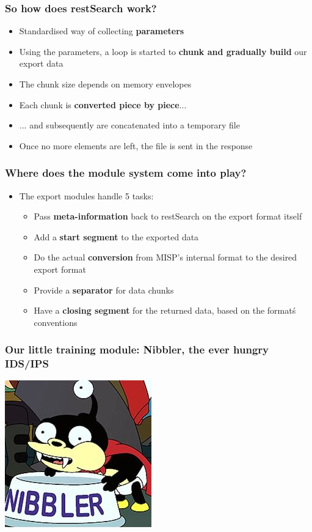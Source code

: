 \begin{frame}
  \frametitle{So how does restSearch work?}
  \begin{itemize}
    \item Standardised way of collecting {\bf parameters}
    \item Using the parameters, a loop is started to {\bf chunk and gradually build} our export data
    \item The chunk size depends on memory envelopes
    \item Each chunk is {\bf converted piece by piece}...
    \item ... and subsequently are concatenated into a temporary file
    \item Once no more elements are left, the file is sent in the response
  \end{itemize}
\end{frame}

\begin{frame}
  \frametitle{Where does the module system come into play?}
  \begin{itemize}
    \item The export modules handle 5 tasks:
    \begin{itemize}
      \item Pass {\bf meta-information} back to restSearch on the export format itself
      \item Add a {\bf start segment} to the exported data
      \item Do the actual {\bf conversion} from MISP's internal format to the desired export format
      \item Provide a {\bf separator} for data chunks
      \item Have a {\bf closing segment} for the returned data, based on the format\'s conventions
    \end{itemize}
  \end{itemize}
\end{frame}

\begin{frame}
  \frametitle{Our little training module: Nibbler, the ever hungry IDS/IPS}
  \begin{center}
    \includegraphics[scale=0.5]{nibbler.jpg}
  \end{center}
\end{frame}

